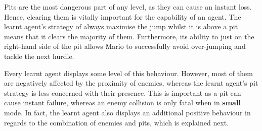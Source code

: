 Pits are the most dangerous part of any level, as they can cause an instant loss. Hence, clearing them is vitally important for the capability of an agent. The learnt agent's strategy of always maximise the jump whilst it is above a pit means that it clears the majority of them. Furthermore, its ability to just on the right-hand side of the pit allows Mario to successfully avoid over-jumping and tackle the next hurdle.

Every learnt agent displays some level of this behaviour. However, most of them are negatively affected by the proximity of enemies, whereas the learnt agent's pit strategy is less concerned with their presence. This is important as a pit can cause instant failure, whereas an enemy collision is only fatal when in \textbf{small} mode. In fact, the learnt agent also displays an additional positive behaviour in regards to the combination of enemies and pits, which is explained next.


\clearpage

